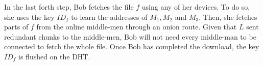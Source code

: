 In the last forth step, Bob fetches the file $f$ using any of her devices.
To do so, she uses the key $ID_f$ to learn the addresses of $M_1, M_2$ and $M_3$.
Then, she fetches parts of $f$ from the online middle-men through an onion route.
Given that $L$ sent redundant chunks to the middle-men, Bob will not need every middle-man to be connected to fetch the whole file.
Once Bob has completed the download, the key $ID_f$ is flushed on the DHT.


